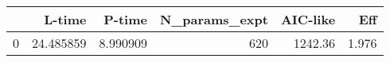 \begin{tabular}{lrrrrr}
\toprule
{} &     L-time &    P-time &  N\_params\_expt &  AIC-like &    Eff \\
\midrule
0 &  24.485859 &  8.990909 &            620 &   1242.36 &  1.976 \\
\bottomrule
\end{tabular}
